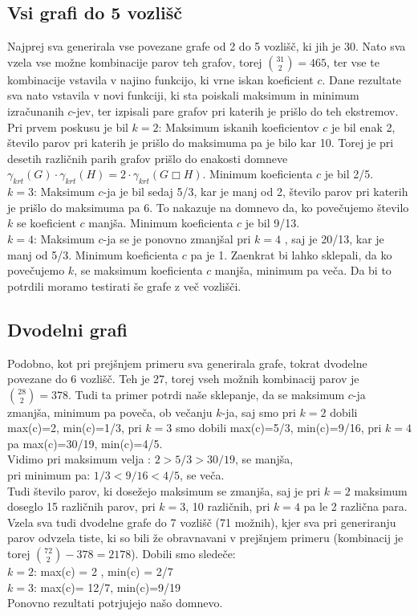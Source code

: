 \documentclass[12pt, a4paper]{article}
\begin{document}
\subsection{Vsi grafi do 5 vozlišč}
Najprej sva generirala vse povezane grafe od 2 do 5 vozlišč, ki jih je 30. Nato sva vzela vse možne kombinacije parov teh grafov, torej $\binom{31}{2}=465$, ter vse te kombinacije vstavila v najino funkcijo, ki vrne iskan koeficient $c$. Dane rezultate sva nato vstavila v novi funkciji, ki sta poiskali maksimum in minimum izračunanih $c$-jev, ter izpisali pare grafov pri katerih je prišlo do teh ekstremov. \\
Pri prvem poskusu je bil $k=2$: Maksimum iskanih koeficientov $c$ je bil enak 2, število parov pri katerih je prišlo do maksimuma pa je bilo kar 10. Torej je pri desetih različnih parih grafov prišlo do enakosti domneve $\gamma_{krt}(G) \cdot \gamma_{krt}(H) = 2 \cdot \gamma_{krt}(G \Box H)$. Minimum koeficienta $c$ je bil 2/5. \\
$k=3$:  Maksimum $c$-ja je bil sedaj 5/3, kar je manj od 2, število parov pri katerih je prišlo do maksimuma pa 6. To nakazuje na domnevo da, ko povečujemo število $k$ se koeficient $c$ manjša. Minimum koeficienta $c$ je bil 9/13. \\
$k=4$: Maksimum $c$-ja se je ponovno zmanjšal pri $k=4$ , saj je 20/13, kar je manj od 5/3. Minimum koeficienta $c$ pa je 1.
Zaenkrat bi lahko sklepali, da ko povečujemo $k$, se maksimum koeficienta $c$ manjša, minimum pa veča. Da bi to potrdili moramo testirati še grafe z več vozlišči. \\

\subsection{Dvodelni grafi}
Podobno, kot pri prejšnjem primeru sva generirala grafe, tokrat dvodelne povezane do 6 vozlišč. Teh je 27, torej vseh možnih kombinacij parov je $\binom{28}{2}=378$. Tudi ta primer potrdi naše sklepanje, da se maksimum $c$-ja zmanjša, minimum pa poveča, ob večanju $k$-ja, saj smo pri $k=2$ dobili max(c)=2, min(c)=1/3, pri $k=3$ smo dobili max(c)=5/3, min(c)=9/16, pri $k=4$ pa max(c)=30/19, min(c)=4/5. \\
Vidimo pri maksimum velja : $2>5/3>30/19$, se manjša, \\
pri minimum pa: $1/3<9/16<4/5$, se veča. \\
Tudi število parov, ki dosežejo maksimum se zmanjša, saj je pri $k=2$ maksimum doseglo 15 različnih parov, pri $k=3$, 10 različnih, pri $k=4$ pa le 2 različna para. \\
Vzela sva tudi dvodelne grafe do 7 vozlišč (71 možnih), kjer sva pri generiranju parov odvzela tiste, ki so bili že obravnavani v prejšnjem primeru (kombinacij je torej $\binom{72}{2} - 378=2178$). Dobili smo sledeče: \\
$k=2$:  max(c) = 2 , min(c) = 2/7 \\
$k=3$:  max(c)= 12/7,  min(c)=9/19 \\
Ponovno rezultati potrjujejo našo domnevo.
\end{document}
